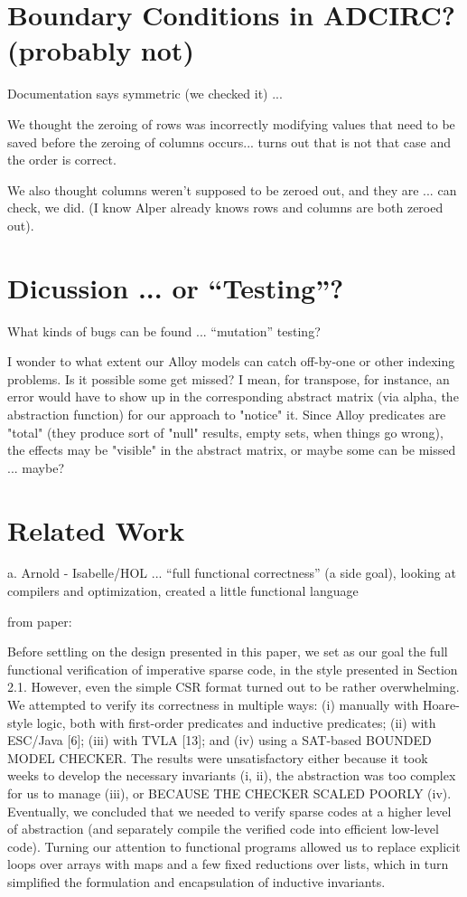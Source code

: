 \documentclass{article}
\begin{document}
\section*{Boundary Conditions in ADCIRC? (probably not)}

Documentation says symmetric (we checked it) ...

\cbstart
We thought the zeroing of rows was incorrectly modifying values that need to be saved before the zeroing of columns occurs... turns out that is not that case and the order is correct.
\cbend

\cbstart
We also thought columns weren't supposed to be zeroed out, and they
are ... can check, we did.  (I know Alper already knows rows and
columns are both zeroed out).
\cbend

\section{Dicussion ... or ``Testing''?}


What kinds of bugs can be found ... ``mutation'' testing?

I wonder to what extent our Alloy models can catch off-by-one or other
indexing problems.  Is it possible some get missed?  I mean, for
transpose, for instance, an error would have to show up in the
corresponding abstract matrix (via alpha, the abstraction function)
for our approach to "notice" it.  Since Alloy predicates are "total"
(they produce sort of "null" results, empty sets, when things go
wrong), the effects may be "visible" in the abstract matrix, or maybe
some can be missed ... maybe?

\section{Related Work}

a. Arnold - Isabelle/HOL ... ``full functional correctness'' (a side
     goal), looking at compilers and optimization, created a little
     functional language

from paper:

Before settling on the design presented in this paper, we set as our
goal the full functional verification of imperative sparse code, in
the style presented in Section 2.1. However, even the simple CSR
format turned out to be rather overwhelming. We attempted to verify
its correctness in multiple ways: (i) manually with Hoare-style logic,
both with first-order predicates and inductive predicates; (ii) with
ESC/Java [6]; (iii) with TVLA [13]; and (iv) using a SAT-based BOUNDED
MODEL CHECKER. The results were unsatisfactory either because it took
weeks to develop the necessary invariants (i, ii), the abstraction was
too complex for us to manage (iii), or BECAUSE THE CHECKER SCALED
POORLY (iv). Eventually, we concluded that we needed to verify sparse
codes at a higher level of abstraction (and separately compile the
verified code into efficient low-level code). Turning our attention to
functional programs allowed us to replace explicit loops over arrays
with maps and a few fixed reductions over lists, which in turn
simplified the formulation and encapsulation of inductive invariants.
\end{document}
